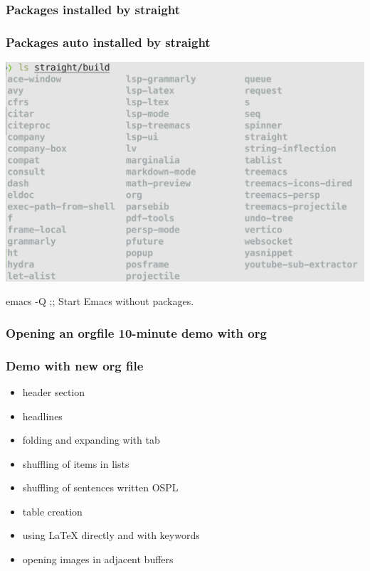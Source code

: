 \documentclass[aspectratio=169]{beamer}
\begin{document}
\subsubsection{Packages installed by straight}
\begin{frame}
\frametitle{Packages auto installed by straight }
\begin{center}
    \includegraphics[scale=0.23]{Figures/build.png}
\end{center}
emacs -Q ;; Start Emacs without packages.
\end{frame}

\subsubsection{Opening an orgfile 10-minute demo with org}

\begin{frame}
\frametitle{Demo with new org file}
\begin{center}
\Large{
\begin{itemize}[font=$\bullet$\scshape\bfseries]
\item header section
\item headlines
\item folding and expanding with tab
\item shuffling of items in lists
\item shuffling of sentences written OSPL
\item table creation
\item using LaTeX directly and with keywords
\item opening images in adjacent buffers
\end{itemize}
}
\end{center}
\end{frame}
\end{document}
